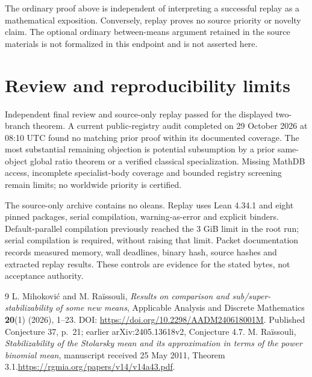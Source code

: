 \documentclass[11pt]{article}
\begin{document}
The ordinary proof above is independent of interpreting a successful replay as a mathematical exposition. Conversely, replay proves no source priority or novelty claim. The optional ordinary between-means argument retained in the source materials is not formalized in this endpoint and is not asserted here.
\newpage
\section{Review and reproducibility limits}
Independent final review and source-only replay passed for the displayed two-branch theorem. A current public-registry audit completed on 29 October 2026 at 08:10 UTC found no matching prior proof within its documented coverage. The most substantial remaining objection is potential subsumption by a prior same-object global ratio theorem or a verified classical specialization. Missing MathDB access, incomplete specialist-body coverage and bounded registry screening remain limits; no worldwide priority is certified.

The source-only archive contains no oleans. Replay uses Lean 4.34.1 and eight pinned packages, serial compilation, warning-as-error and explicit binders. Default-parallel compilation previously reached the 3 GiB limit in the root run; serial compilation is required, without raising that limit. Packet documentation records measured memory, wall deadlines, binary hash, source hashes and extracted replay results. These controls are evidence for the stated bytes, not acceptance authority.
\begin{thebibliography}{9}
 L. Mihokovi\'c and M. Ra\"issouli,
\emph{Results on comparison and sub/super-stabilizability of some new means},
Applicable Analysis and Discrete Mathematics \textbf{20}(1) (2026), 1--23.
DOI: \url{https://doi.org/10.2298/AADM240618001M}.
Published Conjecture 37, p.~21; earlier arXiv:2405.13618v2, Conjecture 4.7.
 M. Ra\"issouli, \emph{Stabilizability of the Stolarsky mean and its approximation in terms of the power binomial mean}, manuscript received 25 May 2011, Theorem 3.1.\newline\url{https://rgmia.org/papers/v14/v14a43.pdf}.
\end{thebibliography}
\end{document}
